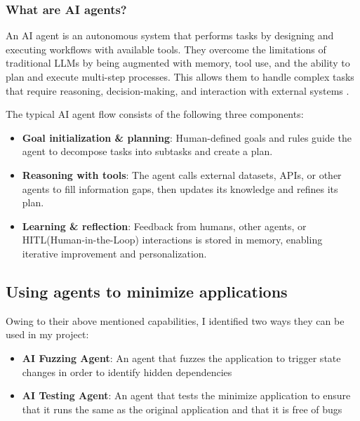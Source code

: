 
\subsubsection*{What are AI agents?}

An AI agent is an autonomous system that performs tasks by designing and executing workflows 
with available tools. They overcome the limitations of traditional LLMs by being augmented with
memory, tool use, and the ability to plan and execute multi-step processes. This allows them to
handle complex tasks that require reasoning, decision-making, and interaction with external systems
\cite{what-are-ai-agents}.

The typical AI agent flow consists of the following three components:
\begin{itemize}
\item \textbf{Goal initialization \& planning}: Human-defined goals and rules guide the agent to decompose tasks into subtasks and create a plan.
\item \textbf{Reasoning with tools}: The agent calls external datasets, APIs, or other agents to fill information gaps, then updates its knowledge and refines its plan.
\item \textbf{Learning \& reflection}: Feedback from humans, other agents, or HITL(Human-in-the-Loop) interactions is stored in memory, enabling iterative improvement and personalization.
\end{itemize}


\subsection*{Using agents to minimize applications}

Owing to their above mentioned capabilities, I identified two ways they can be used in my
project:

\begin{itemize}
\item \textbf{AI Fuzzing Agent}: An agent that fuzzes the application to trigger state changes in order to identify hidden dependencies
\item \textbf{AI Testing Agent}: An agent that tests the minimize application to ensure that it runs the same as the original application and that it is free of bugs
\end{itemize}

